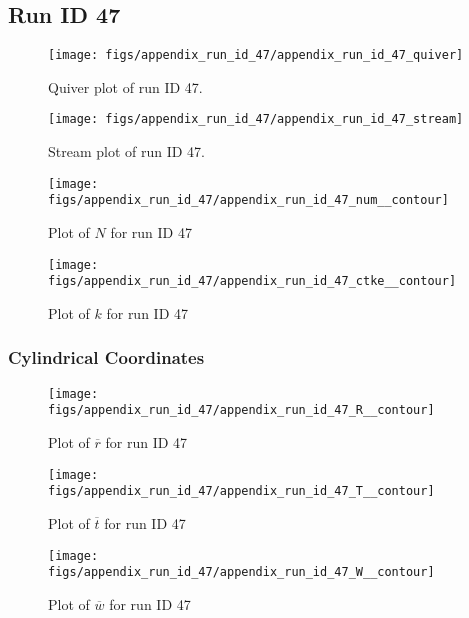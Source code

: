 \subsection{Run ID 47}
\begin{figure}[H]
\centering
\texttt{[image: figs/appendix\_run\_id\_47/appendix\_run\_id\_47\_quiver]}
\caption{Quiver plot of run ID 47.}
\label{fig:appendix_run_id_47_quiver}
\end{figure}


\begin{figure}[H]
\centering
\texttt{[image: figs/appendix\_run\_id\_47/appendix\_run\_id\_47\_stream]}
\caption{Stream plot of run ID 47.}
\label{fig:appendix_run_id_47_stream}
\end{figure}


\begin{figure}[H]
\centering
\texttt{[image: figs/appendix\_run\_id\_47/appendix\_run\_id\_47\_num\_\_contour]}
\caption{Plot of $N$ for run ID 47}
\label{fig:appendix_run_id_47_num__contour}
\end{figure}


\begin{figure}[H]
\centering
\texttt{[image: figs/appendix\_run\_id\_47/appendix\_run\_id\_47\_ctke\_\_contour]}
\caption{Plot of $k$ for run ID 47}
\label{fig:appendix_run_id_47_ctke__contour}
\end{figure}


\subsubsection{Cylindrical Coordinates}
\begin{figure}[H]
\centering
\texttt{[image: figs/appendix\_run\_id\_47/appendix\_run\_id\_47\_R\_\_contour]}
\caption{Plot of $\overline{r}$ for run ID 47}
\label{fig:appendix_run_id_47_R__contour}
\end{figure}


\begin{figure}[H]
\centering
\texttt{[image: figs/appendix\_run\_id\_47/appendix\_run\_id\_47\_T\_\_contour]}
\caption{Plot of $\overline{t}$ for run ID 47}
\label{fig:appendix_run_id_47_T__contour}
\end{figure}


\begin{figure}[H]
\centering
\texttt{[image: figs/appendix\_run\_id\_47/appendix\_run\_id\_47\_W\_\_contour]}
\caption{Plot of $\overline{w}$ for run ID 47}
\label{fig:appendix_run_id_47_W__contour}
\end{figure}


